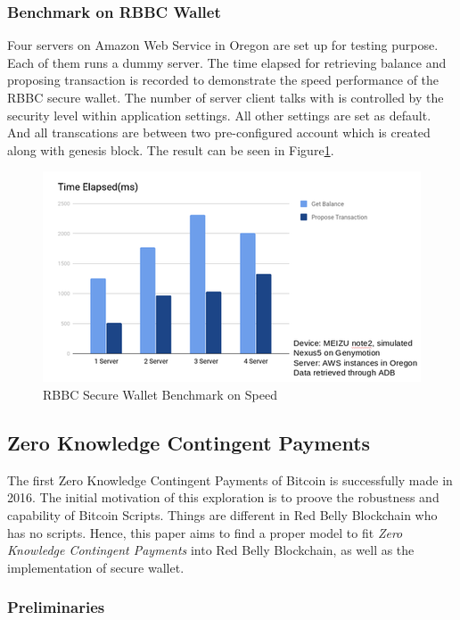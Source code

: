 \documentclass[12pt]{article}
\begin{document}
\subsubsection{Benchmark on RBBC Wallet}

Four servers on Amazon Web Service in Oregon are set up for testing purpose. Each of them runs a dummy server. The time elapsed for retrieving balance and proposing transaction is recorded to demonstrate the speed performance of the RBBC secure wallet. The number of server client talks with is controlled by the security level within application settings. All other settings are set as default. And all transcations are between two pre-configured account which is created along with genesis block. The result can be seen in Figure\ref{fig:benchmark}.

\begin{figure}
   \includegraphics{benchmark.png}
   \caption{RBBC Secure Wallet Benchmark on Speed}
   \label{fig:benchmark} 
\end{figure}

\subsection{Zero Knowledge Contingent Payments}

The first Zero Knowledge Contingent Payments of Bitcoin is successfully made in 2016. The initial motivation of this exploration is to proove the robustness and capability of Bitcoin Scripts. Things are different in Red Belly Blockchain who has no scripts. Hence, this paper aims to find a proper model to fit \textit{Zero Knowledge Contingent Payments} into Red Belly Blockchain, as well as the implementation of secure wallet.

\subsubsection{Preliminaries}
\label{sec:zkcp_preliminaries}
\end{document}
